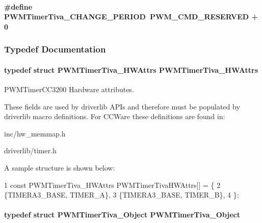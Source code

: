 \paragraph[{P\+W\+M\+Timer\+Tiva\+\_\+\+C\+H\+A\+N\+G\+E\+\_\+\+P\+E\+R\+I\+O\+D}]{\setlength{\rightskip}{0pt plus 5cm}\#define P\+W\+M\+Timer\+Tiva\+\_\+\+C\+H\+A\+N\+G\+E\+\_\+\+P\+E\+R\+I\+O\+D~{\bf P\+W\+M\+\_\+\+C\+M\+D\+\_\+\+R\+E\+S\+E\+R\+V\+E\+D} + 0}\label{_p_w_m_timer_tiva_8h_ad16a2de6625d6aabef487d2ec63e447c}


\subsubsection{Typedef Documentation}
\paragraph[{P\+W\+M\+Timer\+Tiva\+\_\+\+H\+W\+Attrs}]{\setlength{\rightskip}{0pt plus 5cm}typedef struct {\bf P\+W\+M\+Timer\+Tiva\+\_\+\+H\+W\+Attrs}  {\bf P\+W\+M\+Timer\+Tiva\+\_\+\+H\+W\+Attrs}}\label{_p_w_m_timer_tiva_8h_adfca3d3443cb74ff428f0e95e5cceefb}


P\+W\+M\+Timer\+C\+C3200 Hardware attributes. 

These fields are used by driverlib A\+P\+Is and therefore must be populated by driverlib macro definitions. For C\+C\+Ware these definitions are found in\+:
\begin{DoxyItemize}
\item inc/hw\+\_\+memmap.\+h
\item driverlib/timer.\+h
\end{DoxyItemize}

A sample structure is shown below\+: 
\begin{DoxyCode}
1 const PWMTimerTiva\_HWAttrs PWMTimerTivaHWAttrs[] = \{
2     \{TIMERA3\_BASE, TIMER\_A\},
3     \{TIMERA3\_BASE, TIMER\_B\},
4 \};
\end{DoxyCode}
\paragraph[{P\+W\+M\+Timer\+Tiva\+\_\+\+Object}]{\setlength{\rightskip}{0pt plus 5cm}typedef struct {\bf P\+W\+M\+Timer\+Tiva\+\_\+\+Object}  {\bf P\+W\+M\+Timer\+Tiva\+\_\+\+Object}}\label{_p_w_m_timer_tiva_8h_aa113ed38a67720c1fbd892428c1a9952}


